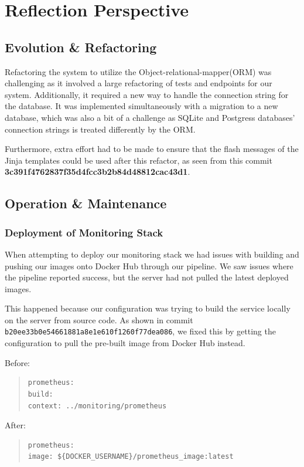 
\section{Reflection Perspective}
\subsection{Evolution \& Refactoring}
Refactoring the system to utilize the Object-relational-mapper(ORM) was challenging as it involved a large refactoring of tests and endpoints for our system. Additionally, it required a new way to handle the connection string for the database. It was implemented simultaneously with a migration to a new database, which was also a bit of a challenge as SQLite and Postgress databases' connection strings is treated differently by the ORM.\newline 

\noindent Furthermore, extra effort had to be made to ensure that the flash messages of the Jinja templates could be used after this refactor, as seen from this commit \textbf{3c391f4762837f35d4fcc3b2b84d48812cac43d1}. 

\subsection{Operation \& Maintenance}


\subsubsection{Deployment of Monitoring Stack}
\noindent When attempting to deploy our monitoring stack we had issues with building and pushing our images onto Docker Hub through our pipeline. We saw issues where the pipeline reported success, but the server had not pulled the latest deployed images. \newline

\noindent This happened because our configuration was trying to build the service locally on the server from source code. As shown in commit \texttt{b20ee33b0e54661881a8e1e610f1260f77dea086}, we fixed this by  getting the configuration to pull the pre-built image from Docker Hub instead.\newline

\noindent Before:
\begin{quote}
\begin{verbatim}
prometheus:
build:
context: ../monitoring/prometheus
\end{verbatim}
\end{quote}
\noindent After:
\begin{quote}
\begin{verbatim}
prometheus:
image: ${DOCKER_USERNAME}/prometheus_image:latest
\end{verbatim}
\end{quote}



